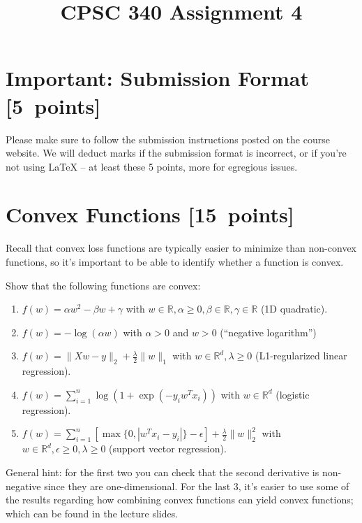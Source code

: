 \documentclass{article}
\newcommand{\blu}[1]{{\textcolor{blu}{#1}}}
\let\ask\blu
\newcommand\pts[1]{\textcolor{pointscolour}{[#1~points]}}
\def\R{\mathbb{R}}
\newcommand{\norm}[1]{\lVert #1 \rVert}
\begin{document}
\title{CPSC 340 Assignment 4}
\date{}
\maketitle

\vspace{-4em}

\section*{Important: Submission Format \pts{5}}

    Please make sure to follow the submission instructions posted on the course website.
    \ask{We will deduct marks if the submission format is incorrect, or if you're not using \LaTeX{}} -- at least these 5 points, more for egregious issues.

\section{Convex Functions \pts{15}}

Recall that convex loss functions are typically easier to minimize than non-convex functions, so it's important to be able to identify whether a function is convex.

\ask{Show that the following functions are convex}:

\begin{enumerate}
\item $f(w) = \alpha w^2 - \beta w + \gamma$ with $w \in \R, \alpha \geq 0, \beta \in \R, \gamma \in \R$ (1D quadratic).

\item $f(w) = -\log(\alpha w) $ with $\alpha > 0$ and $w > 0$ (``negative logarithm'')

\item $f(w) = \norm{Xw-y}_2 + \frac{\lambda}{2}\norm{w}_1$ with $w \in \R^d, \lambda \geq 0$ (L1-regularized linear regression).

\item $f(w) = \sum_{i=1}^n \log(1+\exp(-y_iw^Tx_i)) $ with $w \in \R^d$ (logistic regression).

\item $f(w) = \sum_{i=1}^n[\max\{0,|w^Tx_i - y_i|\} - \epsilon] + \frac{\lambda}{2}\norm{w}_2^2$  with $w \in \R^d, \epsilon \geq 0, \lambda \geq 0$ (support vector regression).

\end{enumerate}

General hint: for the first two you can check that the second derivative is non-negative since they are one-dimensional. For the last 3, it's easier to use some of the results regarding how combining convex functions can yield convex functions; which can be found in the lecture slides.
\end{document}

